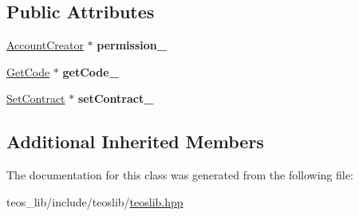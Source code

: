 \subsection*{Public Attributes}
\begin{DoxyCompactItemize}
\item 
\mbox{\label{classteoslib_1_1_account_af1131080cf08f479b1429dd46d141383}} 
\mbox{\hyperlink{classteoslib_1_1_account_creator}{Account\+Creator}} $\ast$ {\bfseries permission\+\_\+}
\item 
\mbox{\label{classteoslib_1_1_account_a0c5a7d913d0ed779d7f8b58adfa564d4}} 
\mbox{\hyperlink{classteos_1_1command_1_1_get_code}{Get\+Code}} $\ast$ {\bfseries get\+Code\+\_\+}
\item 
\mbox{\label{classteoslib_1_1_account_aa10eba476a0d489bf2af62a2fc6f4869}} 
\mbox{\hyperlink{classteos_1_1command_1_1_set_contract}{Set\+Contract}} $\ast$ {\bfseries set\+Contract\+\_\+}
\end{DoxyCompactItemize}
\subsection*{Additional Inherited Members}


The documentation for this class was generated from the following file\+:\begin{DoxyCompactItemize}
\item 
teos\+\_\+lib/include/teoslib/\mbox{\hyperlink{teoslib_8hpp}{teoslib.\+hpp}}\end{DoxyCompactItemize}

